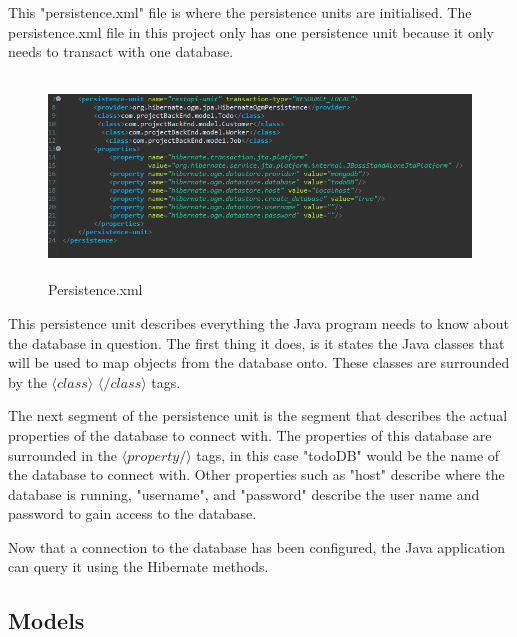\bigskip

This "persistence.xml" file is where the persistence units are initialised. The persistence.xml file in this project only has one persistence unit because it only needs to transact with one database.

\begin{figure}[H]
    \centering
    \includegraphics[width=\textwidth, height=150pt]{DesignImages/persistence.PNG}
    \caption{Persistence.xml}
    \label{fig:my_label}
\end{figure}

\bigskip

This persistence unit describes everything the Java program needs to know about the database in question. The first thing it does, is it states the Java classes that will be used to map objects from the database onto. These classes are surrounded by the $\langle class \rangle$ $\langle /class \rangle$ tags. 

\bigskip

The next segment of the persistence unit is the segment that describes the actual properties of the database to connect with. The properties of this database are surrounded in the $\langle property/ \rangle$  tags, in this case "todoDB" would be the name of the database to connect with. Other properties such as "host" describe where the database is running, "username", and "password" describe the user name and password to gain access to the database.

\bigskip

Now that a connection to the database has been configured, the Java application can query it using the Hibernate methods.

\subsection{Models}
\label{sec:SystemDesignModels}

